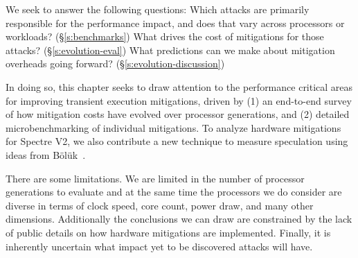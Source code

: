 We seek to answer the following questions: 
Which attacks are primarily responsible for the performance impact, and does that vary across processors or workloads? (\S\ref{s:benchmarks})
What drives the cost of mitigations for those attacks? (\S\ref{s:evolution-eval})
What predictions can we make about mitigation overheads going forward? (\S\ref{s:evolution-discussion})




In doing so, this chapter seeks to draw attention to the performance critical areas for improving transient execution mitigations, driven by (1) an end-to-end survey of how mitigation costs have evolved over processor generations, and (2) detailed microbenchmarking of individual mitigations.
To analyze hardware mitigations for Spectre V2, we also contribute a new technique to measure speculation using ideas from Bölük~\cite{speculating-x86}.

There are some limitations.
We are limited in the number of processor generations to evaluate and at the same time the processors we do consider are diverse in terms of clock speed, core count, power draw, and many other dimensions.
Additionally the conclusions we can draw are constrained by the lack of public details on how hardware mitigations are implemented.  
Finally, it is inherently uncertain what impact yet to be discovered attacks will have.


